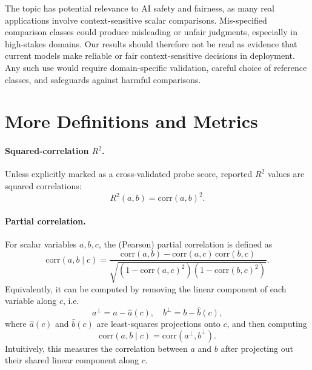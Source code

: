 \documentclass{article}
\begin{document}
The topic has potential relevance to AI safety and fairness, as many real applications involve context-sensitive scalar comparisons.
Mis-specified comparison classes could produce misleading or unfair judgments, especially in high-stakes domains. 
Our results should therefore not be read as evidence that current models make reliable or fair context-sensitive decisions in deployment. 
Any such use would require domain-specific validation, careful choice of reference classes, and safeguards against harmful comparisons.




\appendix
{}
\onecolumn

\section{More Definitions and Metrics}
\label{app:definitions}
\paragraph{Squared-correlation $R^2$.}
Unless explicitly marked as a cross-validated probe score, reported $R^2$ values are squared correlations:
\[
R^2(a,b)=\mathrm{corr}(a,b)^2.
\]

\paragraph{Partial correlation.}\label{app:partial-corr}
For scalar variables $a,b,c$, the (Pearson) partial correlation is defined as
\[
\mathrm{corr}(a,b \mid c)
=
\frac{
\mathrm{corr}(a,b) - \mathrm{corr}(a,c)\,\mathrm{corr}(b,c)
}{
\sqrt{(1-\mathrm{corr}(a,c)^2)(1-\mathrm{corr}(b,c)^2)}
}.
\]
Equivalently, it can be computed by removing the linear component of each variable along $c$, i.e.
\[
a^\perp = a - \hat a(c), \quad b^\perp = b - \hat b(c),
\]
where $\hat a(c)$ and $\hat b(c)$ are least-squares projections onto $c$, and then computing
\[
\mathrm{corr}(a,b \mid c) = \mathrm{corr}(a^\perp, b^\perp).
\]
Intuitively, this measures the correlation between $a$ and $b$ after projecting out their shared linear component along $c$.

\end{document}

